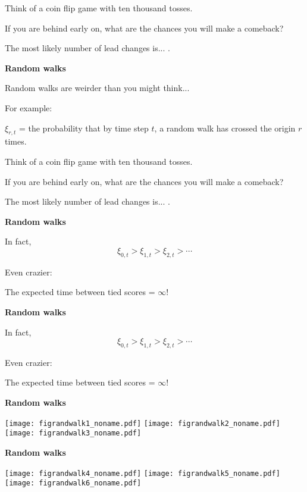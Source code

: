   Think of a coin flip game with ten thousand tosses.

  If you are behind early on, what are the chances you
  will make a comeback?

  The most likely number of lead changes is...  
  .



  \textbf{Random walks}

  Random walks are weirder than you might think...

  For example:

  $\xi_{r,t}$ = the probability that by time step $t$,
  a random walk has crossed the origin $r$ times.

  Think of a coin flip game with ten thousand tosses.

  If you are behind early on, what are the chances you
  will make a comeback?

  The most likely number of lead changes is...  
  .



  \textbf{Random walks}

  In fact,
  $$\xi_{0,t} > \xi_{1,t} > \xi_{2,t} > \cdots $$

  \inv 

  Even crazier:

  The expected time between tied scores = $\infty$!


  \textbf{Random walks}

  In fact,
  $$\xi_{0,t} > \xi_{1,t} > \xi_{2,t} > \cdots $$

  Even crazier:

  The expected time between tied scores = $\infty$!


  \textbf{Random walks}

  \texttt{[image: figrandwalk1\_noname.pdf]}
  \texttt{[image: figrandwalk2\_noname.pdf]}
  \texttt{[image: figrandwalk3\_noname.pdf]}


  \textbf{Random walks}

  \texttt{[image: figrandwalk4\_noname.pdf]}
  \texttt{[image: figrandwalk5\_noname.pdf]}
  \texttt{[image: figrandwalk6\_noname.pdf]}




